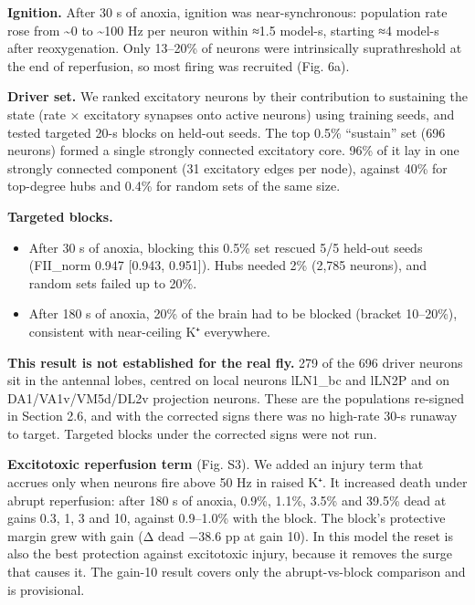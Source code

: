\documentclass[11pt]{article}
\providecommand{\tightlist}{\setlength{\itemsep}{0pt}\setlength{\parskip}{0pt}}
\begin{document}
\textbf{Ignition.} After 30 s of anoxia, ignition was near-synchronous: population rate rose from \textasciitilde0 to \textasciitilde100 Hz per neuron within ≈1.5 model-s, starting ≈4 model-s after reoxygenation. Only 13--20\% of neurons were intrinsically suprathreshold at the end of reperfusion, so most firing was recruited (Fig. 6a).

\textbf{Driver set.} We ranked excitatory neurons by their contribution to sustaining the state (rate × excitatory synapses onto active neurons) using training seeds, and tested targeted 20-s blocks on held-out seeds. The top 0.5\% ``sustain'' set (696 neurons) formed a single strongly connected excitatory core. 96\% of it lay in one strongly connected component (31 excitatory edges per node), against 40\% for top-degree hubs and 0.4\% for random sets of the same size.

\textbf{Targeted blocks.}

\begin{itemize}
\tightlist
\item
  After 30 s of anoxia, blocking this 0.5\% set rescued 5/5 held-out seeds (FII\_norm 0.947 {[}0.943, 0.951{]}). Hubs needed 2\% (2,785 neurons), and random sets failed up to 20\%.
\item
  After 180 s of anoxia, 20\% of the brain had to be blocked (bracket 10--20\%), consistent with near-ceiling K⁺ everywhere.
\end{itemize}

\textbf{This result is not established for the real fly.} 279 of the 696 driver neurons sit in the antennal lobes, centred on local neurons lLN1\_bc and lLN2P and on DA1/VA1v/VM5d/DL2v projection neurons. These are the populations re-signed in Section 2.6, and with the corrected signs there was no high-rate 30-s runaway to target. Targeted blocks under the corrected signs were not run.

\textbf{Excitotoxic reperfusion term} (Fig. S3). We added an injury term that accrues only when neurons fire above 50 Hz in raised K⁺. It increased death under abrupt reperfusion: after 180 s of anoxia, 0.9\%, 1.1\%, 3.5\% and 39.5\% dead at gains 0.3, 1, 3 and 10, against 0.9--1.0\% with the block. The block's protective margin grew with gain (Δ dead −38.6 pp at gain 10). In this model the reset is also the best protection against excitotoxic injury, because it removes the surge that causes it. The gain-10 result covers only the abrupt-vs-block comparison and is provisional.
\end{document}
